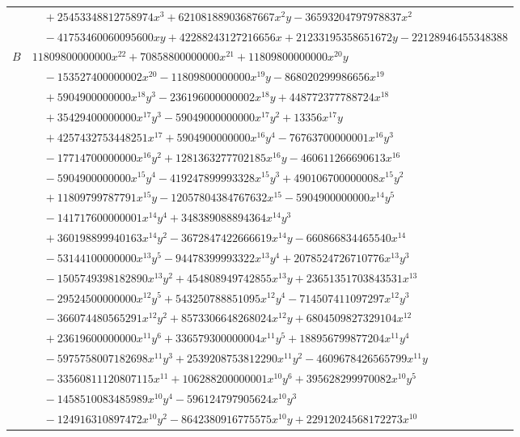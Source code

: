 \documentclass[11pt]{article}
\begin{document}
\begin{longtable}{@{}ll@{}}
 & $\quad +25453348812758974x^{3}+62108188903687667x^{2}y-36593204797978837x^{2}$\\
 & $\quad -41753460060095600xy+42288243127216656x+21233195358651672y-22128946455348388$\\
$B$ & $11809800000000x^{22}+70858800000000x^{21}+11809800000000x^{20}y$\\
 & $\quad -153527400000002x^{20}-11809800000000x^{19}y-868020299986656x^{19}$\\
 & $\quad +5904900000000x^{18}y^{3}-236196000000002x^{18}y+448772377788724x^{18}$\\
 & $\quad +35429400000000x^{17}y^{3}-59049000000000x^{17}y^{2}+13356x^{17}y$\\
 & $\quad +4257432753448251x^{17}+5904900000000x^{16}y^{4}-76763700000001x^{16}y^{3}$\\
 & $\quad -17714700000000x^{16}y^{2}+1281363277702185x^{16}y-460611266690613x^{16}$\\
 & $\quad -5904900000000x^{15}y^{4}-419247899993328x^{15}y^{3}+490106700000008x^{15}y^{2}$\\
 & $\quad +11809799787791x^{15}y-12057804384767632x^{15}-5904900000000x^{14}y^{5}$\\
 & $\quad -141717600000001x^{14}y^{4}+348389088894364x^{14}y^{3}$\\
 & $\quad +360198899940163x^{14}y^{2}-3672847422666619x^{14}y-660866834465540x^{14}$\\
 & $\quad -53144100000000x^{13}y^{5}-94478399993322x^{13}y^{4}+2078524726710776x^{13}y^{3}$\\
 & $\quad -1505749398182890x^{13}y^{2}+454808949742855x^{13}y+23651351703843531x^{13}$\\
 & $\quad -29524500000000x^{12}y^{5}+543250788851095x^{12}y^{4}-714507411097297x^{12}y^{3}$\\
 & $\quad -366074480565291x^{12}y^{2}+8573306648268024x^{12}y+6804509827329104x^{12}$\\
 & $\quad +23619600000000x^{11}y^{6}+336579300000004x^{11}y^{5}+188956799877204x^{11}y^{4}$\\
 & $\quad -5975758007182698x^{11}y^{3}+2539208753812290x^{11}y^{2}-4609678426565799x^{11}y$\\
 & $\quad -33560811120807115x^{11}+106288200000001x^{10}y^{6}+395628299970082x^{10}y^{5}$\\
 & $\quad -1458510083485989x^{10}y^{4}-596124797905624x^{10}y^{3}$\\
 & $\quad -124916310897472x^{10}y^{2}-8642380916775575x^{10}y+22912024568172273x^{10}$\\

\end{longtable}
\end{document}
